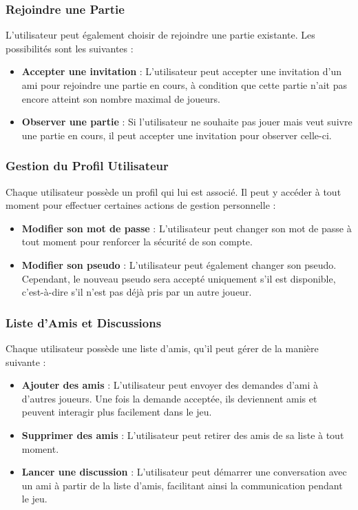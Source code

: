 \documentclass{report}
\begin{document}
\subsubsection{Rejoindre une Partie}

\noindent L'utilisateur peut également choisir de rejoindre une partie existante. Les possibilités sont les suivantes :

\begin{itemize}
    \item \textbf{Accepter une invitation} : L'utilisateur peut accepter une invitation d'un ami pour rejoindre une partie en cours, à condition que cette partie n'ait pas encore atteint son nombre maximal de joueurs.
    \item \textbf{Observer une partie} : Si l'utilisateur ne souhaite pas jouer mais veut suivre une partie en cours, il peut accepter une invitation pour observer celle-ci.
\end{itemize}

\subsubsection{Gestion du Profil Utilisateur}

\noindent Chaque utilisateur possède un profil qui lui est associé. Il peut y accéder à tout moment pour effectuer certaines actions de gestion personnelle :
\begin{itemize}
    \item \textbf{Modifier son mot de passe} : L'utilisateur peut changer son mot de passe à tout moment pour renforcer la sécurité de son compte.
    \item \textbf{Modifier son pseudo} : L'utilisateur peut également changer son pseudo. Cependant, le nouveau pseudo sera accepté uniquement s'il est disponible, c'est-à-dire s'il n'est pas déjà pris par un autre joueur.
\end{itemize}

\subsubsection{Liste d'Amis et Discussions}

\noindent Chaque utilisateur possède une liste d'amis, qu'il peut gérer de la manière suivante :

\begin{itemize}
    \item \textbf{Ajouter des amis} : L'utilisateur peut envoyer des demandes d'ami à d'autres joueurs. Une fois la demande acceptée, ils deviennent amis et peuvent interagir plus facilement dans le jeu.
    \item \textbf{Supprimer des amis} : L'utilisateur peut retirer des amis de sa liste à tout moment.
    \item \textbf{Lancer une discussion} : L'utilisateur peut démarrer une conversation avec un ami à partir de la liste d'amis, facilitant ainsi la communication pendant le jeu.
\end{itemize}
\end{document}
